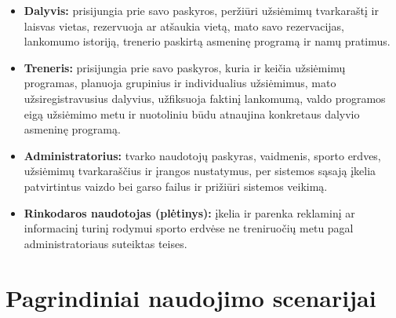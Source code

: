 \documentclass[a4paper,11pt]{article}
\begin{document}
\begin{itemize}
    \item \textbf{Dalyvis:} prisijungia prie savo paskyros, peržiūri užsiėmimų tvarkaraštį ir laisvas vietas, rezervuoja ar atšaukia vietą, mato savo rezervacijas, lankomumo istoriją, trenerio paskirtą asmeninę programą ir namų pratimus.
    \item \textbf{Treneris:} prisijungia prie savo paskyros, kuria ir keičia užsiėmimų programas, planuoja grupinius ir individualius užsiėmimus, mato užsiregistravusius dalyvius, užfiksuoja faktinį lankomumą, valdo programos eigą užsiėmimo metu ir nuotoliniu būdu atnaujina konkretaus dalyvio asmeninę programą.
    \item \textbf{Administratorius:} tvarko naudotojų paskyras, vaidmenis, sporto erdves, užsiėmimų tvarkaraščius ir įrangos nustatymus, per sistemos sąsają įkelia patvirtintus vaizdo bei garso failus ir prižiūri sistemos veikimą.
    \item \textbf{Rinkodaros naudotojas (plėtinys):} įkelia ir parenka reklaminį ar informacinį turinį rodymui sporto erdvėse ne treniruočių metu pagal administratoriaus suteiktas teises.
\end{itemize}

\section{Pagrindiniai naudojimo scenarijai}
\end{document}
